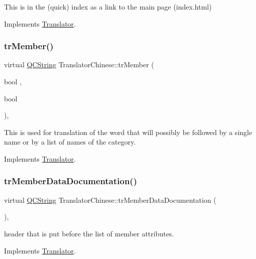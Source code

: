 This is in the (quick) index as a link to the main page (index.\+html) 

Implements \mbox{\hyperlink{class_translator}{Translator}}.

\mbox{\label{class_translator_chinese_a4011f5d9da39a73cc371e00f0370abaa}} 
\subsubsection{\texorpdfstring{trMember()}{trMember()}}
{\footnotesize\ttfamily virtual \mbox{\hyperlink{class_q_c_string}{Q\+C\+String}} Translator\+Chinese\+::tr\+Member (\begin{DoxyParamCaption}\item[{bool}]{,  }\item[{bool}]{ }\end{DoxyParamCaption})\hspace{0.3cm}{\ttfamily [inline]}, {\ttfamily [virtual]}}

This is used for translation of the word that will possibly be followed by a single name or by a list of names of the category. 

Implements \mbox{\hyperlink{class_translator}{Translator}}.

\mbox{\label{class_translator_chinese_a46981e79d304b17e88c5d2bef7d362eb}} 
\subsubsection{\texorpdfstring{trMemberDataDocumentation()}{trMemberDataDocumentation()}}
{\footnotesize\ttfamily virtual \mbox{\hyperlink{class_q_c_string}{Q\+C\+String}} Translator\+Chinese\+::tr\+Member\+Data\+Documentation (\begin{DoxyParamCaption}{ }\end{DoxyParamCaption})\hspace{0.3cm}{\ttfamily [inline]}, {\ttfamily [virtual]}}

header that is put before the list of member attributes. 

Implements \mbox{\hyperlink{class_translator}{Translator}}.

